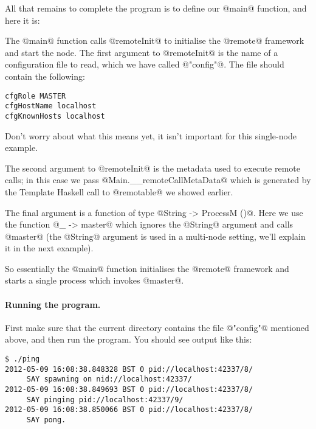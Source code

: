 
All that remains to complete the program is to define our @main@
function, and here it is:


The @main@ function calls @remoteInit@ to initialise the @remote@
framework and start the node.  The first argument to @remoteInit@ is
the name of a configuration file to read, which we have called
@"config"@.  The file should contain the following:

\begin{verbatim}
cfgRole MASTER
cfgHostName localhost
cfgKnownHosts localhost
\end{verbatim}

Don't worry about what this means yet, it isn't important for this
single-node example.

The second argument to @remoteInit@ is the metadata used to execute
remote calls; in this case we pass @Main.__remoteCallMetaData@ which
is generated by the Template Haskell call to @remotable@ we showed
earlier.

The final argument is a function of type @String -> ProcessM ()@.
Here we use the function @\_ -> master@ which ignores the @String@
argument and calls @master@ (the @String@ argument is used in a
multi-node setting, we'll explain it in the next example).

So essentially the @main@ function initialises the @remote@ framework
and starts a single process which invokes @master@.

\paragraph{Running the program.}  First make sure that
the current directory contains the file @"config"@ mentioned above,
and then run the program.  You should see output like this:

\begin{verbatim}
$ ./ping
2012-05-09 16:08:38.848328 BST 0 pid://localhost:42337/8/
     SAY spawning on nid://localhost:42337/
2012-05-09 16:08:38.849693 BST 0 pid://localhost:42337/8/
     SAY pinging pid://localhost:42337/9/
2012-05-09 16:08:38.850066 BST 0 pid://localhost:42337/8/
     SAY pong.
\end{verbatim}

